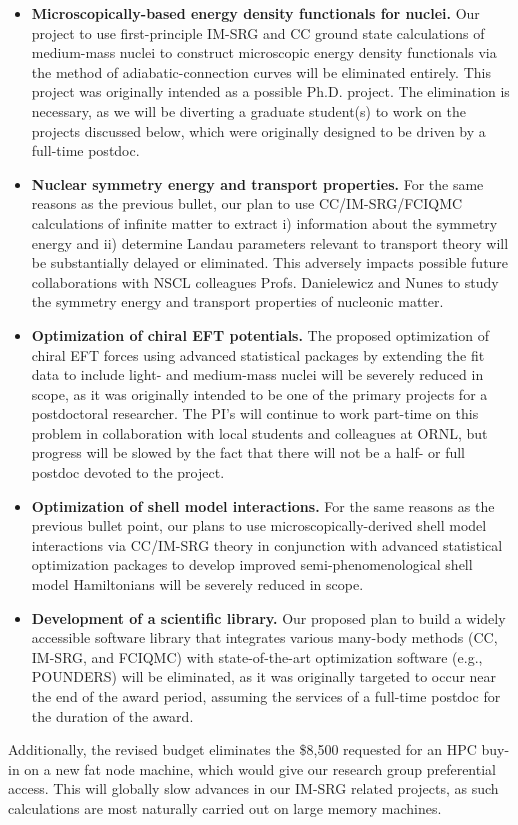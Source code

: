 \documentclass[12pt]{article}
\begin{document}
\begin{itemize}
\item {\bf Microscopically-based energy density functionals for nuclei.}  Our project to use first-principle IM-SRG and CC ground state calculations of medium-mass nuclei to construct microscopic energy density functionals via the method of adiabatic-connection curves will be eliminated entirely. This project was originally intended as a possible Ph.D. project. The elimination is necessary, as we will be diverting a graduate student(s) to work on the projects discussed below, which were originally designed to be driven by a full-time postdoc.

\item{\bf Nuclear symmetry energy and transport properties.} For the same reasons as the previous bullet, our plan to use CC/IM-SRG/FCIQMC calculations of infinite matter to extract i) information about the symmetry energy and ii) determine Landau parameters relevant to transport theory will be substantially delayed or eliminated.  This adversely impacts possible future collaborations with NSCL colleagues Profs. Danielewicz and Nunes to study the symmetry energy and transport properties of nucleonic matter.

\item{\bf Optimization of chiral EFT potentials.} The proposed optimization of chiral EFT forces using advanced statistical packages by extending the fit data to include light- and medium-mass nuclei will be severely reduced in scope, as it was originally intended to be one of the primary projects for a postdoctoral researcher. The PI's will continue to work part-time on this problem in collaboration with local students and colleagues at ORNL, but progress will be slowed by the fact that there will not be a half- or full postdoc devoted to the project.  
\item{\bf Optimization of shell model interactions.} For the same reasons as the previous bullet point, our plans to use microscopically-derived shell model interactions via CC/IM-SRG theory in conjunction with advanced statistical optimization packages to develop improved semi-phenomenological shell model Hamiltonians will be severely reduced in scope. 

\item{\bf Development of a scientific library.} Our proposed plan to build a widely accessible software library that integrates various many-body methods (CC, IM-SRG, and FCIQMC) with state-of-the-art optimization software (e.g., POUNDERS) will be eliminated, as it was originally targeted to occur near the end of the award period, assuming the services of a full-time postdoc for the duration of the award.

\end{itemize}

Additionally, the revised budget eliminates the \$8,500 requested for an HPC buy-in on a new fat node machine, which would give our research group preferential access. This will globally slow advances in our IM-SRG related projects, as such calculations are most naturally carried out on large memory machines.  
\end{document}
